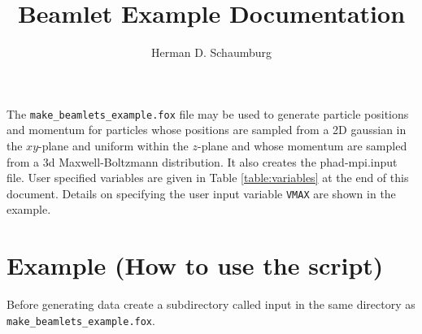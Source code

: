 \documentclass[12pt]{article}
\begin{document}
\lstset{basicstyle = \ttfamily,columns=fullflexible}

\title{Beamlet Example Documentation}
\author{Herman D. Schaumburg}

\maketitle

The \texttt{make{\_}beamlets{\_}example.fox} file may be used to generate particle positions and momentum for particles whose positions are sampled from a 2D gaussian in the $xy$-plane and uniform within the $z$-plane and whose momentum are sampled from a 3d Maxwell-Boltzmann distribution.  It also creates the phad-mpi.input file.  User specified variables are given in Table \ref{table:variables} at the end of this document.  Details on specifying the user input variable \texttt{VMAX} are shown in the example. 

\section*{Example (How to use the script)}

Before generating data create a subdirectory called input in the same directory as \texttt{make{\_}}\newline\texttt{beamlets{\_}example.fox}.
\end{document}
